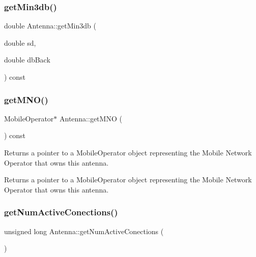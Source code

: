 \subsubsection{\texorpdfstring{get\+Min3db()}{getMin3db()}}
{\footnotesize\ttfamily double Antenna\+::get\+Min3db (\begin{DoxyParamCaption}\item[{double}]{sd,  }\item[{double}]{db\+Back }\end{DoxyParamCaption}) const\hspace{0.3cm}{\ttfamily [private]}}

\mbox{\label{class_antenna_abfbb4a654f73fe0c3a30f50777f79349}} 
\subsubsection{\texorpdfstring{get\+M\+N\+O()}{getMNO()}}
{\footnotesize\ttfamily Mobile\+Operator$\ast$ Antenna\+::get\+M\+NO (\begin{DoxyParamCaption}{ }\end{DoxyParamCaption}) const}

Returns a pointer to a Mobile\+Operator object representing the Mobile Network Operator that owns this antenna. \begin{DoxyReturn}{Returns}
a pointer to a Mobile\+Operator object representing the Mobile Network Operator that owns this antenna. 
\end{DoxyReturn}
\mbox{\label{class_antenna_a86c5c094ab6ea432609afa00f3a8080a}} 
\subsubsection{\texorpdfstring{get\+Num\+Active\+Conections()}{getNumActiveConections()}}
{\footnotesize\ttfamily unsigned long Antenna\+::get\+Num\+Active\+Conections (\begin{DoxyParamCaption}{ }\end{DoxyParamCaption})\hspace{0.3cm}{\ttfamily [private]}}

\mbox{\label{class_antenna_afca01d00c8e393ee911f1e9240b51d2e}} 
